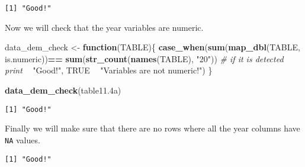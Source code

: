 \documentclass[
]{article}
\newenvironment{Shaded}{\begin{snugshade}}{\end{snugshade}}
\newcommand{\CommentTok}[1]{\textcolor[rgb]{0.56,0.35,0.01}{\textit{#1}}}
\newcommand{\ControlFlowTok}[1]{\textcolor[rgb]{0.13,0.29,0.53}{\textbf{#1}}}
\newcommand{\DecValTok}[1]{\textcolor[rgb]{0.00,0.00,0.81}{#1}}
\newcommand{\FloatTok}[1]{\textcolor[rgb]{0.00,0.00,0.81}{#1}}
\newcommand{\KeywordTok}[1]{\textcolor[rgb]{0.13,0.29,0.53}{\textbf{#1}}}
\newcommand{\NormalTok}[1]{#1}
\newcommand{\OperatorTok}[1]{\textcolor[rgb]{0.81,0.36,0.00}{\textbf{#1}}}
\newcommand{\OtherTok}[1]{\textcolor[rgb]{0.56,0.35,0.01}{#1}}
\newcommand{\StringTok}[1]{\textcolor[rgb]{0.31,0.60,0.02}{#1}}
\begin{document}
\begin{verbatim}
[1] "Good!"
\end{verbatim}

Now we will check that the year variables are numeric.

\begin{Shaded}
\begin{Highlighting}[]
\NormalTok{data_dem_check <-}\StringTok{ }\ControlFlowTok{function}\NormalTok{(TABLE)\{}
  \KeywordTok{case_when}\NormalTok{(}\KeywordTok{sum}\NormalTok{(}\KeywordTok{map_dbl}\NormalTok{(TABLE, is.numeric))}\OperatorTok{==}\StringTok{ }\KeywordTok{sum}\NormalTok{(}\KeywordTok{str_count}\NormalTok{(}\KeywordTok{names}\NormalTok{(TABLE), }\StringTok{"20"}\NormalTok{))}
  \CommentTok{# if it is detected print }
         \OperatorTok{~}\StringTok{ "Good!"}\NormalTok{,}
    \OtherTok{TRUE} \OperatorTok{~}\StringTok{ "Variables are not numeric!"}\NormalTok{)}
\NormalTok{\}}

\KeywordTok{data_dem_check}\NormalTok{(table11}\FloatTok{.4}\NormalTok{a)}
\end{Highlighting}
\end{Shaded}

\begin{verbatim}
[1] "Good!"
\end{verbatim}

Finally we will make sure that there are no rows where all the year
columns have \texttt{NA} values.

\begin{Shaded}
\end{Shaded}

\begin{verbatim}
[1] "Good!"
\end{verbatim}
\end{document}
